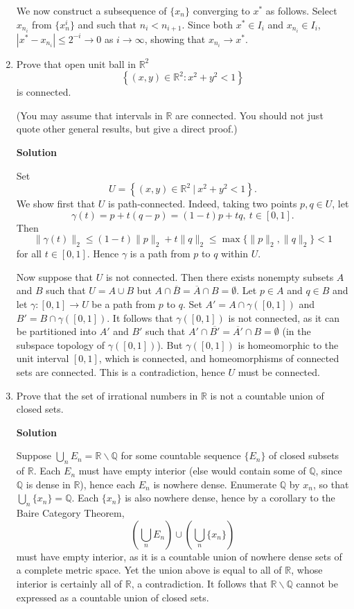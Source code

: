 \documentclass{article}
\begin{document}
\begin{enumerate}
We now construct a subsequence of \(\{x_n\}\) converging to \(x^*\) as follows.  Select \(x_{n_i}\) from \(\{x_n^i\}\) and such that \(n_i < n_{i + 1}\).  Since both \(x^* \in I_i\) and \(x_{n_i} \in I_i\), \(|x^* - x_{n_i}| \leq 2^{-i} \to 0\) as \(i \to \infty\), showing that \(x_{n_i} \to x^*\).



\item Prove that open unit ball in \(\mathbb{R}^2\)
\[\left\{ (x,y) \in \mathbb{R}^2 : x^2 + y^2 < 1 \right\}\]
is connected.

(You may assume that intervals in \(\mathbb{R}\) are connected.  You should not just quote other general results, but give a direct proof.)

{\bf Solution}

Set
\[U = \left\{ (x,y) \in \mathbb{R}^2 \ | \ x^2 + y^2 < 1 \right\}.\]
We show first that \(U\) is path-connected.  Indeed, taking two points \(p,q \in U\), let
\[\gamma(t) = p + t(q - p) = (1 - t)p + tq, \ t \in [0,1].\]
Then
\[\|\gamma(t)\|_2 \leq (1 - t)\|p\|_2 + t\|q\|_2 \leq \max \{\|p\|_2, \|q\|_2\} < 1\]
for all \(t \in [0,1]\).  Hence \(\gamma\) is a path from \(p\) to \(q\) within \(U\).

Now suppose that \(U\) is not connected.  Then there exists nonempty subsets \(A\) and \(B\) such that \(U = A \cup B\) but \(A \cap \overline{B} = \overline{A} \cap B = \emptyset\).  Let \(p \in A\) and \(q \in B\) and let \(\gamma : [0,1] \to U\) be a path from \(p\) to \(q\).  Set \(A' = A \cap \gamma([0,1])\) and \(B' = B \cap \gamma([0,1])\).  It follows that \(\gamma([0,1])\) is not connected, as it can be partitioned into \(A'\) and \(B'\) such that \(A' \cap \overline{B'} = \overline{A'} \cap B = \emptyset\) (in the subspace topology of \(\gamma([0,1])\)).  But \(\gamma([0,1])\) is homeomorphic to the unit interval \([0,1]\), which is connected, and homeomorphisms of connected sets are connected.  This is a contradiction, hence \(U\) must be connected.



\item Prove that the set of irrational numbers in \(\mathbb{R}\) is not a countable union of closed sets.

{\bf Solution}

Suppose \(\bigcup_n E_n = \mathbb{R} \backslash \mathbb{Q}\) for some countable sequence \(\{E_n\}\) of closed subsets of \(\mathbb{R}\).  Each \(E_n\) must have empty interior (else would contain some of \(\mathbb{Q}\), since \(\mathbb{Q}\) is dense in \(\mathbb{R}\)), hence each \(E_n\) is nowhere dense.  Enumerate \(\mathbb{Q}\) by \(x_n\), so that \(\bigcup_n \{x_n\} = \mathbb{Q}\).  Each \(\{x_n\}\) is also nowhere dense, hence by a corollary to the Baire Category Theorem,
\[\left( \bigcup_n E_n \right) \cup \left( \bigcup_n \{x_n\} \right)\]
must have empty interior, as it is a countable union of nowhere dense sets of a complete metric space.  Yet the union above is equal to all of \(\mathbb{R}\), whose interior is certainly all of \(\mathbb{R}\), a contradiction.  It follows that \(\mathbb{R} \backslash \mathbb{Q}\) cannot be expressed as a countable union of closed sets.




\end{enumerate}
\end{document}
